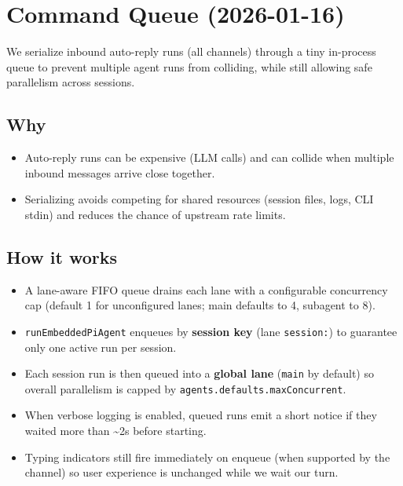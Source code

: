 \clearpage

\section{Command Queue (2026-01-16)}


We serialize inbound auto-reply runs (all channels) through a tiny in-process queue to prevent multiple agent runs from colliding, while still allowing safe parallelism across sessions.

\subsection{Why}


\begin{itemize}
  \item Auto-reply runs can be expensive (LLM calls) and can collide when multiple inbound messages arrive close together.
  \item Serializing avoids competing for shared resources (session files, logs, CLI stdin) and reduces the chance of upstream rate limits.
\end{itemize}


\subsection{How it works}


\begin{itemize}
  \item A lane-aware FIFO queue drains each lane with a configurable concurrency cap (default 1 for unconfigured lanes; main defaults to 4, subagent to 8).
  \item \texttt{runEmbeddedPiAgent} enqueues by \textbf{session key} (lane \texttt{session:}) to guarantee only one active run per session.
  \item Each session run is then queued into a \textbf{global lane} (\texttt{main} by default) so overall parallelism is capped by \texttt{agents.defaults.maxConcurrent}.
  \item When verbose logging is enabled, queued runs emit a short notice if they waited more than \textasciitilde{}2s before starting.
  \item Typing indicators still fire immediately on enqueue (when supported by the channel) so user experience is unchanged while we wait our turn.
\end{itemize}


